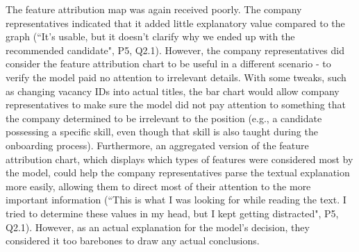The feature attribution map was again received poorly. The company representatives indicated that it added little explanatory value compared to the graph (``It's usable, but it doesn't clarify why we ended up with the recommended candidate", P5, Q2.1). However, the company representatives did consider the feature attribution chart to be useful in a different scenario - to verify the model paid no attention to irrelevant details. With some tweaks, such as changing vacancy IDs into actual titles, the bar chart would allow company representatives to make sure the model did not pay attention to something that the company determined to be irrelevant to the position (e.g., a candidate possessing a specific skill, even though that skill is also taught during the onboarding process). Furthermore, an aggregated version of the feature attribution chart, which displays which types of features were considered most by the model, could help the company representatives parse the textual explanation more easily, allowing them to direct most of their attention to the more important information (``This is what I was looking for while reading the text. I tried to determine these values in my head, but I kept getting distracted", P5, Q2.1). However, as an actual explanation for the model's decision, they considered it too barebones to draw any actual conclusions.

